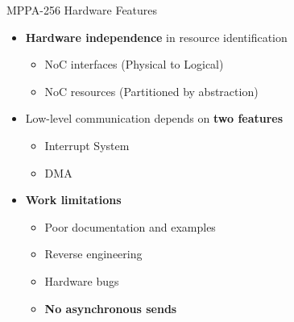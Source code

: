		\begin{frame}[fragile]{MPPA-256 Hardware Features}
			\begin{itemize}
				\item \textbf{Hardware independence} in resource identification
				\begin{itemize}
					\item NoC interfaces (Physical to Logical)
					\item NoC resources (Partitioned by abstraction)
				\end{itemize}
			\end{itemize}

			\begin{itemize}
				\item Low-level communication depends on \textbf{two features}
				\begin{itemize}
					\item Interrupt System
					\item DMA
				\end{itemize}
			\end{itemize}

			\begin{itemize}
				\item \textbf{Work limitations}
				\begin{itemize}
					\item Poor documentation and examples
					\item Reverse engineering
					\item Hardware bugs
					\item \textbf{No asynchronous sends}
				\end{itemize}
			\end{itemize}

		\end{frame}

